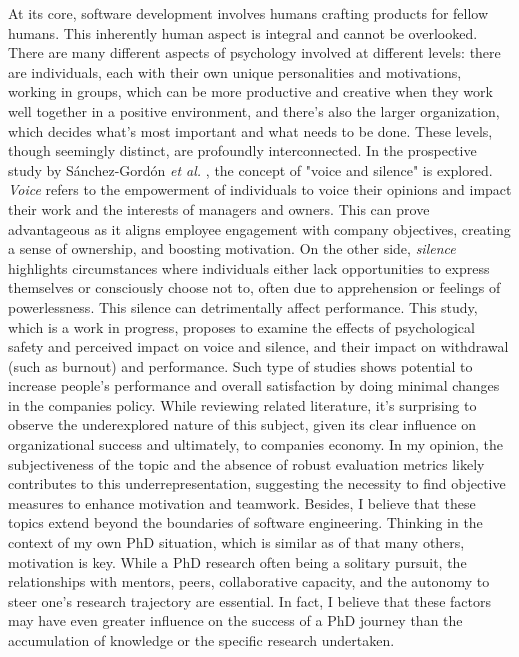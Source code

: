 \documentclass[11pt]{article}
\begin{document}
At its core, software development involves humans crafting products for fellow humans. This inherently human aspect is integral and cannot be overlooked. There are many different aspects of psychology involved at different levels: there are individuals, each with their own unique personalities and motivations, working in groups, which can be more productive and creative when they work well together in a positive environment, and there's also the larger organization, which decides what's most important and what needs to be done. 
These levels, though seemingly distinct, are profoundly interconnected. In the prospective study by Sánchez-Gordón \textit{et al.} \cite{sanchez2023perspective}, the concept of "voice and silence" is explored. \textit{Voice} refers to the empowerment of individuals to voice their opinions and impact their work and the interests of managers and owners. This can prove advantageous as it aligns employee engagement with company objectives, creating a sense of ownership, and boosting motivation. On the other side, \textit{silence} highlights circumstances where individuals either lack opportunities to express themselves or consciously choose not to, often due to apprehension or feelings of powerlessness. This silence can detrimentally affect performance. This study, which is a work in progress, proposes to examine the effects of psychological safety and perceived impact on voice and silence, and their impact on withdrawal (such as burnout) and performance. 
Such type of studies shows potential to increase people's performance and overall satisfaction by doing minimal changes in the companies policy. While reviewing related literature, it's surprising to observe the underexplored nature of this subject, given its clear influence on organizational success and ultimately, to companies economy. In my opinion, the subjectiveness of the topic and the absence of robust evaluation metrics likely contributes to this underrepresentation, suggesting the necessity to find  objective measures to enhance motivation and teamwork.
Besides, I believe that these topics extend beyond the boundaries of software engineering. Thinking in the context of my own PhD situation, which is similar as of that many others, motivation is key. While a PhD research often being a solitary pursuit, the relationships with mentors, peers, collaborative capacity, and the autonomy to steer one's research trajectory are essential. In fact, I believe that these factors may have even greater influence on the success of a PhD journey than the accumulation of knowledge or the specific research undertaken.
\end{document}
